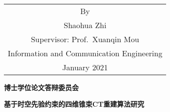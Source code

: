 \begin{titlepage}
\begin{center}
		\vspace{1.4cm}
		{\sanhao
			\begin{center} \renewcommand{\arraystretch}{1.35}
				\begin{tabular}{c}
					By \\
					Shaohua Zhi \\
					Supervisor: Prof.\ Xuanqin Mou \\
					Information and Communication Engineering \\
					January 2021 \\
				\end{tabular} \renewcommand{\arraystretch}{1}
			\end{center}
		}
	\end{center}
	\clearpage{\pagestyle{empty}\cleardoublepage}
	
	\newpage\thispagestyle{empty}


	\begin{center}
		\parbox[t][0cm][t]{\textwidth}{}
		
		\begin{center}{\bfseries{博士学位论文答辩委员会}}\end{center}
		
		\vspace{1cm}
		\begin{center}{\bfseries{基于时空先验约束的四维锥束CT重建算法研究}}\end{center}
		

\end{center}
\end{titlepage}
